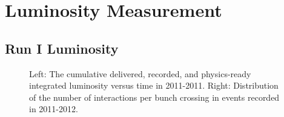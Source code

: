 \chapter{Luminosity Measurement}\label{ch:luminosity}
\section{Run I Luminosity}

\begin{figure}[htbp]
	\centering
	\hfill
	\hfill
	\hfill
	\caption{Left: The cumulative delivered, recorded, and physics-ready integrated luminosity versus time in 2011-2011. Right: Distribution of the number of interactions per bunch crossing in events recorded in 2011-2012.}
	
\end{figure}

